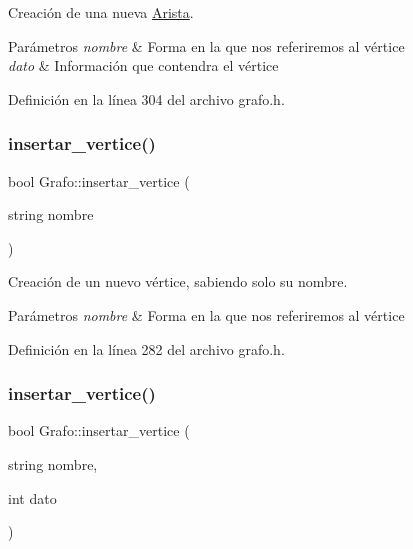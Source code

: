 Creación de una nueva \hyperlink{classArista}{Arista}. 


\begin{DoxyParams}{Parámetros}
{\em nombre} & Forma en la que nos referiremos al vértice \\
\hline
{\em dato} & Información que contendra el vértice \\
\hline
\end{DoxyParams}


Definición en la línea 304 del archivo grafo.\+h.

\mbox{\label{classGrafo_ade13f10eecc05a5a08ef43c26b53e248}} 
\subsubsection{\texorpdfstring{insertar\+\_\+vertice()}{insertar\_vertice()}\hspace{0.1cm}{\footnotesize\ttfamily [1/2]}}
{\footnotesize\ttfamily bool Grafo\+::insertar\+\_\+vertice (\begin{DoxyParamCaption}\item[{string}]{nombre }\end{DoxyParamCaption})}



Creación de un nuevo vértice, sabiendo solo su nombre. 


\begin{DoxyParams}{Parámetros}
{\em nombre} & Forma en la que nos referiremos al vértice \\
\hline
\end{DoxyParams}


Definición en la línea 282 del archivo grafo.\+h.

\mbox{\label{classGrafo_a45450097c4398a0539689245784adf4a}} 
\subsubsection{\texorpdfstring{insertar\+\_\+vertice()}{insertar\_vertice()}\hspace{0.1cm}{\footnotesize\ttfamily [2/2]}}
{\footnotesize\ttfamily bool Grafo\+::insertar\+\_\+vertice (\begin{DoxyParamCaption}\item[{string}]{nombre,  }\item[{int}]{dato }\end{DoxyParamCaption})}



